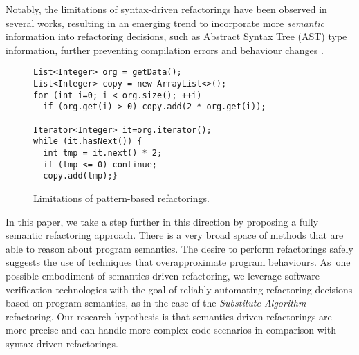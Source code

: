 \documentclass[runningheads,a4paper]{llncs}
\begin{document}
Notably, the limitations of syntax-driven refactorings have been observed
in several works, resulting in an emerging trend to incorporate more {\em semantic}
information into refactoring decisions, such as Abstract Syntax Tree (AST) 
type information,
further preventing compilation errors and behaviour changes
\cite{Steimann2011,Steimann2012Pilgrim,Steimann2011KollePilgrim}.

\begin{figure}
  \begin{lstlisting}[mathescape=true,showstringspaces=false]
List<Integer> org = getData();
List<Integer> copy = new ArrayList<>();
for (int i=0; i < org.size(); ++i)
  if (org.get(i) > 0) copy.add(2 * org.get(i));

Iterator<Integer> it=org.iterator();
while (it.hasNext()) {
  int tmp = it.next() * 2;
  if (tmp <= 0) continue;
  copy.add(tmp);}
\end{lstlisting}
\caption{Limitations of pattern-based refactorings.}
\label{ex:syntax-limits}
\end{figure}

In this paper, we take a step further in this direction by proposing a
fully semantic refactoring approach.  There is a very broad space of
methods that are able to reason about program semantics.  The desire
to perform refactorings safely suggests the use of techniques that
overapproximate program behaviours.  As~one possible embodiment of
semantics-driven refactoring, we leverage software verification
technologies with the goal of reliably automating refactoring
decisions based on program semantics, as in the case of the {\em
  Substitute Algorithm} refactoring. Our research hypothesis is that
semantics-driven refactorings are more precise and can handle more
complex code scenarios in comparison with syntax-driven refactorings.
\end{document}
